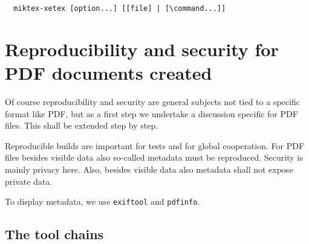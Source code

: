 \documentclass[a4paper, english]{article}%
\newcommand{\lualatex}{\texttt{lualatex}}
\newcommand{\xelatex}{\texttt{xelatex}}
\newcommand{\texlive}{\TeX~Live}
\newcommand{\miktex}{MiKTeX}
\begin{document}


  
  
  

\begin{verbatim}
  miktex-xetex [option...] [[file] | [\command...]]
\end{verbatim}







\section{Reproducibility and security for PDF documents created}\label{sec:PDFreprSec}

Of course reproducibility and security are general subjects not tied to a specific format like PDF, 
but as a first step we undertake a discussion specific for PDF files. 
This shall be extended step by step. 

Reproducible builds are important for tests and for global cooperation. 
For PDF files besides visible data also so-called metadata must be reproduced. 
Security is mainly privacy here. 
Also, besides visible data also metadata shall not expose private data. 


To display metadata, we use \texttt{exiftool} and \texttt{pdfinfo}. 


\subsection{The tool chains}\label{subsec:toolchain}
\end{document}
